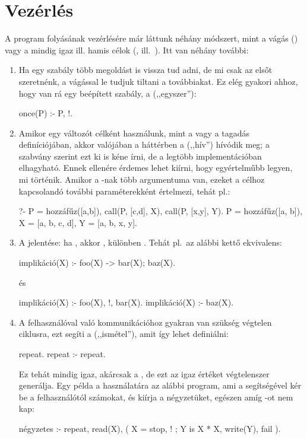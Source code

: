 \section{Vezérlés}
A program folyásának vezérlésére már láttunk néhány
módszert, mint a vágás (\pr{!}) vagy a mindig igaz
ill. hamis célok (,  ill.~).
Itt van néhány további:
\begin{enumerate}
\item Ha egy szabály több megoldást is vissza tud
  adni, de mi csak az elsőt szeretnénk, a vágással
  le tudjuk tiltani a továbbiakat. Ez elég gyakori
  ahhoz, hogy van rá egy beépített szabály, a
   (,,egyszer''):
\begin{program}
once(P) :- P, !.
\end{program}
\item Amikor egy  változót célként használunk,
  mint a  vagy a tagadás definíciójában,
  akkor valójában a háttérben a 
  (,,hív'') hívódik meg; a szabvány szerint ezt ki is kéne írni,
  de a legtöbb implementációban elhagyható. Ennek ellenére
  érdemes lehet kiírni,
  hogy egyértelműbb legyen, mi történik. Amikor a
  -nak több argumentuma van, ezeket a
  célhoz kapcsolandó további paraméterekként
  értelmezi, tehát pl.:
\begin{query}
?- P = hozzáfűz([a,b]),
   call(P, [c,d], X),
   call(P, [x,y], Y).
P = hozzáfűz([a, b]),
X = [a, b, c, d],
Y = [a, b, x, y].
\end{query}
\item A  jelentése: ha , akkor
  , különben . Tehát pl.~az alábbi kettő
  ekvivalens:
\index{\pr{->}}
\begin{program}
implikáció(X) :- foo(X) -> bar(X); baz(X).
\end{program}   
és
\begin{program}
implikáció(X) :- foo(X), !, bar(X).
implikáció(X) :- baz(X).
\end{program}
\item A felhasználóval való kommunikációhoz gyakran
  van szükség végtelen ciklusra, ezt segíti a
   (,,ismétel''), amit így lehet
  definiálni:
\begin{program}  
repeat.
repeat :- repeat.
\end{program}
Ez tehát mindig igaz, akárcsak a , de ezt
az igaz értéket végtelenszer generálja. Egy példa a
használatára az alábbi program, ami a 
segítségével kér be a felhasználótól számokat, és
kiírja a négyzetüket, egészen amíg -ot nem
kap:
\begin{program}
négyzetes :-
    repeat, read(X),
    ( X = stop, !
    ; Y is X * X, write(Y), fail
    ).
\end{program}
\end{enumerate}

